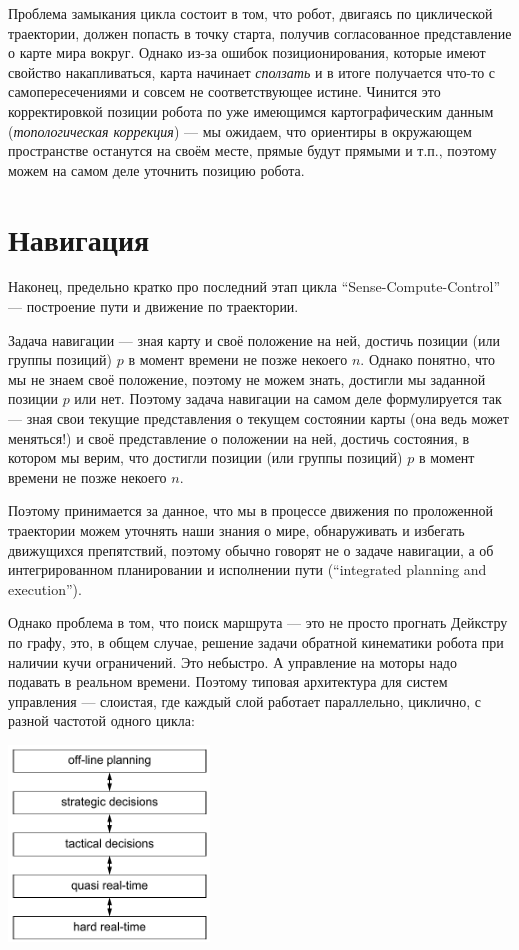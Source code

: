 \documentclass{../../text-style}
\begin{document}
Проблема замыкания цикла состоит в том, что робот, двигаясь по циклической траектории, должен попасть в точку старта, получив согласованное представление о карте мира вокруг.
Однако из-за ошибок позиционирования, которые имеют свойство накапливаться, карта начинает \emph{сползать} и в итоге получается что-то с самопересечениями и совсем не соответствующее истине.
Чинится это корректировкой позиции робота по уже имеющимся картографическим данным (\emph{топологическая коррекция}) --- мы ожидаем, что ориентиры в окружающем пространстве останутся на своём месте, прямые будут прямыми и т.п., поэтому можем на самом деле уточнить позицию робота.

\section{Навигация}

Наконец, предельно кратко про последний этап цикла \enquote{Sense-Compute-Control} --- построение пути и движение по траектории.

Задача навигации --- зная карту и своё положение на ней, достичь позиции (или группы позиций) $p$ в момент времени не позже некоего $n$.
Однако понятно, что мы не знаем своё положение, поэтому не можем знать, достигли мы заданной позиции $p$ или нет.
Поэтому задача навигации на самом деле формулируется так --- зная свои текущие представления о текущем состоянии карты (она ведь может меняться!) и своё представление о положении на ней, достичь состояния, в котором мы верим, что достигли позиции (или группы позиций) $p$ в момент времени не позже некоего $n$.

Поэтому принимается за данное, что мы в процессе движения по проложенной траектории можем уточнять наши знания о мире, обнаруживать и избегать движущихся препятствий, поэтому обычно говорят не о задаче навигации, а об интегрированном планировании и исполнении пути (\enquote{integrated planning and execution}).

Однако проблема в том, что поиск маршрута --- это не просто прогнать Дейкстру по графу, это, в общем случае, решение задачи обратной кинематики робота при наличии кучи ограничений.
Это небыстро.
А управление на моторы надо подавать в реальном времени. 
Поэтому типовая архитектура для систем управления --- слоистая, где каждый слой работает параллельно, циклично, с разной частотой одного цикла:

\begin{center}
    \includegraphics[width=0.4\textwidth]{navigationLayers.png}
\end{center}
\end{document}
